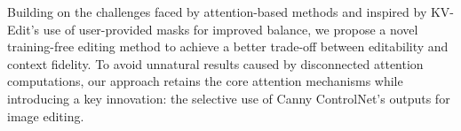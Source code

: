 \documentclass{article}
\begin{document}












Building on the challenges faced by attention-based methods and inspired by KV-Edit’s use of user-provided masks for improved balance, we propose a novel training-free editing method to achieve a better trade-off between editability and context fidelity. To avoid unnatural results caused by disconnected attention computations, our approach retains the core attention mechanisms while introducing a key innovation: the selective use of Canny ControlNet’s outputs \citep{zhang2023adding} for image editing.
\end{document}
